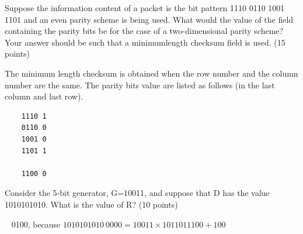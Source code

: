 \begin{exercise}[]{Suppose the information content of a packet is the bit pattern 1110 0110 1001
    1101 and an even parity scheme is being used. What would the value of the field containing
    the parity bits be for the case of a two-dimensional parity scheme? Your answer should be
    such that a minimumlength checksum field is used. (15 points)}
  \begin{solution}
    The minimum length checksum is obtained when the row number and the column number are the same. The parity bits value are listed as follows (in the last column and last row).
  \end{solution}
  \begin{verbatim}
    1110 1
    0110 0
    1001 0
    1101 1

    1100 0
  \end{verbatim}
  \label{ex1}
\end{exercise}



\begin{exercise}[]{Consider the 5-bit generator, G=10011, and suppose that D has the value
    1010101010. What is the value of R? (10 points)}
  \begin{solution}
  \par{~}
  0100, because $1010101010\ 0000 = 10011 \times 1011011100 + 100$
  \end{solution}
  \label{ex2}
\end{exercise}


